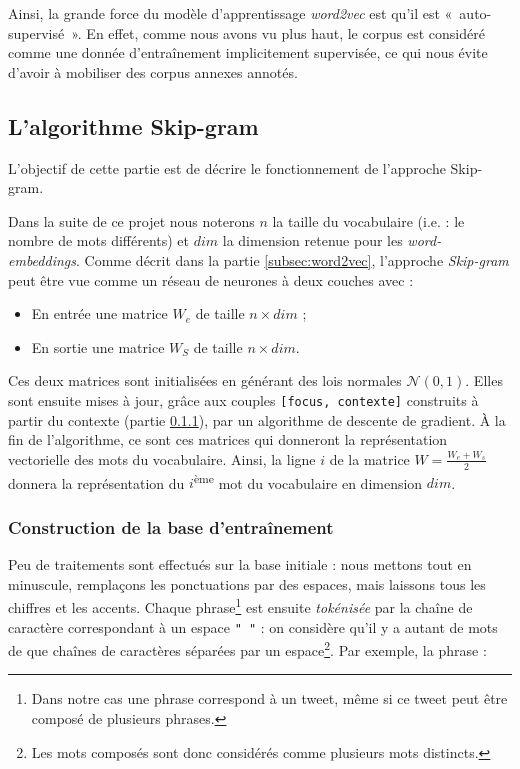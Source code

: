 \documentclass[11pt,french,french]{article}
\let\rmarkdownfootnote\footnote%
\def\footnote{\protect\rmarkdownfootnote}
\begin{document}
Ainsi, la grande force du modèle d'apprentissage \emph{word2vec} est qu'il est «~auto-supervisé~».
En effet, comme nous avons vu plus haut, le corpus est considéré comme une donnée d'entraînement implicitement supervisée, ce qui nous évite d'avoir à mobiliser des corpus annexes annotés.

\hypertarget{sec:skipgram}{%
\subsection{L'algorithme Skip-gram}\label{sec:skipgram}}

L'objectif de cette partie est de décrire le fonctionnement de l'approche Skip-gram.

Dans la suite de ce projet nous noterons \(n\) la taille du vocabulaire (i.e. : le nombre de mots différents) et \(dim\) la dimension retenue pour les \emph{word-embeddings}.
Comme décrit dans la partie \ref{subsec:word2vec}, l'approche \emph{Skip-gram} peut être vue comme un réseau de neurones à deux couches avec :

\begin{itemize}
\item
  En entrée une matrice \(W_e\) de taille \(n\times dim\) ;
\item
  En sortie une matrice \(W_S\) de taille \(n\times dim\).
\end{itemize}

Ces deux matrices sont initialisées en générant des lois normales \(\mathcal N(0,1)\). Elles sont ensuite mises à jour, grâce aux couples \texttt{{[}focus,\ contexte{]}} construits à partir du contexte (partie \ref{subsec:baseentrainement}), par un algorithme de descente de gradient.
À la fin de l'algorithme, ce sont ces matrices qui donneront la représentation vectorielle des mots du vocabulaire.
Ainsi, la ligne \(i\) de la matrice \(W=\frac{W_e+W_s}{2}\) donnera la représentation du \(i\)\textsuperscript{ème} mot du vocabulaire en dimension \(dim\).

\hypertarget{subsec:baseentrainement}{%
\subsubsection{Construction de la base d'entraînement}\label{subsec:baseentrainement}}

Peu de traitements sont effectués sur la base initiale : nous mettons tout en minuscule, remplaçons les ponctuations par des espaces, mais laissons tous les chiffres et les accents.
Chaque phrase\footnote{Dans notre cas une phrase correspond à un tweet, même si ce tweet peut être composé de plusieurs phrases.}
est ensuite \emph{tokénisée} par la chaîne de caractère correspondant à un espace \texttt{"\ "} : on considère qu'il y a autant de mots de que chaînes de caractères séparées par un espace\footnote{Les mots composés sont donc considérés comme plusieurs mots distincts.}. Par exemple, la phrase :
\end{document}
